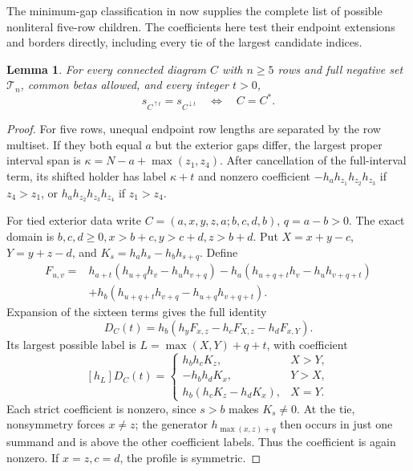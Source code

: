 \documentclass[11pt,a4paper]{amsart}
\numberwithin{equation}{section}
\theoremstyle{plain}
\newtheorem{lemma}[theorem]{Lemma}
\theoremstyle{definition}
\begin{document}
The minimum-gap classification in  now supplies
the complete list of possible nonliteral five-row children.  The
coefficients here test their endpoint extensions and borders
directly, including every tie of the largest candidate indices.

\begin{lemma}\label{lem:staircase-endpoint}
For every connected diagram \(C\) with \(n\ge5\) rows and full negative
set \(\mathcal T_n\), common betas allowed, and every integer \(t>0\),
\[
 s_{C^{\uparrow t}}=s_{C^{\downarrow t}}\quad\Longleftrightarrow\quad C=C^*.
\]
\end{lemma}

\begin{proof}
For five rows, unequal endpoint row lengths are separated by the row
multiset.  If they both equal \(a\) but the exterior gaps differ, the
largest proper interval span is
\(\kappa=N-a+\max(z_1,z_4)\).
After cancellation of the full-interval term, its shifted holder has
label \(\kappa+t\) and nonzero coefficient
\(-h_a h_{z_1}h_{z_2}h_{z_3}\) if \(z_4>z_1\), or
\(h_a h_{z_2}h_{z_3}h_{z_4}\) if \(z_1>z_4\).

For tied exterior data write
\(C=(a,x,y,z,a;b,c,d,b)\), \(q=a-b>0\).
The exact domain is
\(b,c,d\ge0,x>b+c,y>c+d,z>b+d\).
Put \(X=x+y-c\), \(Y=y+z-d\), and
\(K_s=h_a h_s-h_bh_{s+q}\).  Define
\[
\begin{split}
 F_{u,v}={}&h_{a+t}(h_{u+q}h_v-h_uh_{v+q})
 -h_a(h_{u+q+t}h_v-h_uh_{v+q+t})\\
 &+h_b(h_{u+q+t}h_{v+q}-h_{u+q}h_{v+q+t}).
\end{split}
\]
Expansion of the sixteen terms gives the full identity
\[
 D_C(t)=h_b(h_yF_{x,z}-h_cF_{X,z}-h_dF_{x,Y}).
\]
Its largest possible label is \(L=\max(X,Y)+q+t\), with coefficient
\[
 [h_L]D_C(t)=\begin{cases}
 h_bh_cK_z,&X>Y,\\
 -h_bh_dK_x,&Y>X,\\
 h_b(h_cK_z-h_dK_x),&X=Y.
 \end{cases}
\]
Each strict coefficient is nonzero, since \(s>b\) makes \(K_s\ne0\).
At the tie, nonsymmetry forces \(x\ne z\); the generator
\(h_{\max(x,z)+q}\) then occurs in just one summand and is above the
other coefficient labels.  Thus the coefficient is again nonzero.
If \(x=z,c=d\), the profile is symmetric.


\end{proof}
\end{document}
